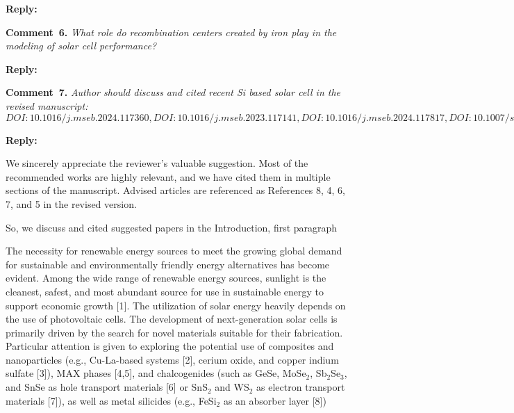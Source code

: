 \documentclass[a4paper,fleqn]{cas-sc}
\begin{document}
\noindent
\textcolor[rgb]{0.51,0.00,0.00}{\textbf{Reply:}}



\vspace{1cm}
\noindent
\textcolor[rgb]{0.00,0.50,1.00}{\textbf{Comment~6.}}
\emph{What role do recombination centers created by iron play in the modeling of solar cell performance?}


\noindent
\textcolor[rgb]{0.51,0.00,0.00}{\textbf{Reply:}}



\vspace{1cm}
\noindent
\textcolor[rgb]{0.00,0.50,1.00}{\textbf{Comment~7.}}
\emph{Author should discuss and cited recent Si based solar cell in the revised manuscript:
$DOI:10.1016/j.mseb.2024.117360,
DOI:10.1016/j.mseb.2023.117141,
DOI:10.1016/j.mseb.2024.117817,
DOI:10.1007/s42247-024-00821-y,
DOI:10.1016/j.inoche.2024.112785$}

\noindent
\textcolor[rgb]{0.51,0.00,0.00}{\textbf{Reply:}}


We sincerely appreciate the reviewer’s valuable suggestion.
Most of the recommended works are highly relevant, and we have cited them in multiple sections of the manuscript.
Advised articles are referenced as References 8, 4, 6, 7, and 5 in the revised version.

So, we discuss and cited suggested papers in the Introduction, first paragraph

\begin{mdframed}
The necessity for renewable energy sources to meet the growing global demand for sustainable and environmentally friendly energy alternatives has become evident.
Among the wide range of renewable energy sources, sunlight is the cleanest, safest,
and most abundant source for use in sustainable energy to support economic growth [1].
The utilization of solar energy heavily depends on the use of photovoltaic cells.
\textcolor[rgb]{1.00,0.07,0.00}{
The development of next-generation solar cells is primarily driven by the search for novel materials suitable for their fabrication.
Particular attention is given to exploring the potential use of composites and nanoparticles
(e.g., Cu-La-based systems [2], cerium oxide, and copper indium sulfate [3]),
MAX phases [4,5],
and chalcogenides (such as GeSe, MoSe$_2$, Sb$_2$Se$_3$, and SnSe as hole transport materials [6]
or SnS$_2$ and WS$_2$ as electron transport materials [7]),
as well as metal silicides (e.g., FeSi$_2$ as an absorber layer [8])}
\end{mdframed}
\end{document}

